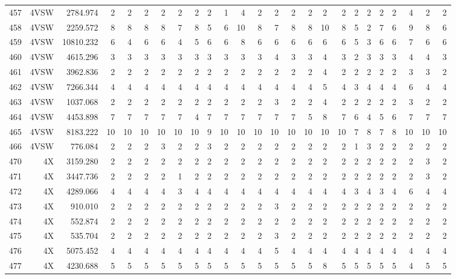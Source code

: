 \documentclass[12pt]{article}\usepackage[]{graphicx}\usepackage[]{color}
\begin{document}
\begin{landscape}
\begin{longtable}[t]{crrrrrrrrrrrrrrrcrrrrrrrr}
457 & 4VSW & 2784.974 & 2 & 2 & 2 & 2 & 2 & 2 & 2 & 1 & 4 & 2 & 2 & 2 & 2 & 2 & 2 & 2 & 2 & 2 & 2 & 4 & 2 & 2\\
458 & 4VSW & 2259.572 & 8 & 8 & 8 & 8 & 7 & 8 & 5 & 6 & 10 & 8 & 7 & 8 & 8 & 10 & 8 & 5 & 2 & 7 & 6 & 9 & 8 & 6\\
459 & 4VSW & 10810.232 & 6 & 4 & 6 & 6 & 4 & 5 & 6 & 6 & 8 & 6 & 6 & 6 & 6 & 6 & 6 & 5 & 3 & 6 & 6 & 7 & 6 & 6\\
460 & 4VSW & 4615.296 & 3 & 3 & 3 & 3 & 3 & 3 & 3 & 3 & 3 & 3 & 4 & 3 & 3 & 4 & 3 & 2 & 3 & 3 & 3 & 4 & 4 & 3\\
461 & 4VSW & 3962.836 & 2 & 2 & 2 & 2 & 2 & 2 & 2 & 2 & 2 & 2 & 2 & 2 & 2 & 4 & 2 & 2 & 2 & 2 & 2 & 3 & 3 & 2\\
462 & 4VSW & 7266.344 & 4 & 4 & 4 & 4 & 4 & 4 & 4 & 4 & 4 & 4 & 4 & 4 & 4 & 5 & 4 & 3 & 4 & 4 & 4 & 6 & 4 & 4\\
463 & 4VSW & 1037.068 & 2 & 2 & 2 & 2 & 2 & 2 & 2 & 2 & 2 & 2 & 3 & 2 & 2 & 4 & 2 & 2 & 2 & 2 & 2 & 3 & 2 & 2\\
464 & 4VSW & 4453.898 & 7 & 7 & 7 & 7 & 7 & 4 & 7 & 7 & 7 & 7 & 7 & 7 & 5 & 8 & 7 & 6 & 4 & 5 & 6 & 7 & 7 & 7\\
465 & 4VSW & 8183.222 & 10 & 10 & 10 & 10 & 10 & 10 & 9 & 10 & 10 & 10 & 10 & 10 & 10 & 10 & 10 & 7 & 8 & 7 & 8 & 10 & 10 & 10\\
466 & 4VSW & 776.084 & 2 & 2 & 2 & 3 & 2 & 2 & 3 & 2 & 2 & 2 & 2 & 2 & 2 & 2 & 2 & 1 & 3 & 2 & 2 & 2 & 2 & 2\\
470 & 4X & 3159.280 & 2 & 2 & 2 & 2 & 2 & 2 & 2 & 2 & 2 & 2 & 2 & 2 & 2 & 2 & 2 & 2 & 2 & 2 & 2 & 2 & 3 & 2\\
471 & 4X & 3447.736 & 2 & 2 & 2 & 2 & 1 & 2 & 2 & 2 & 2 & 2 & 2 & 2 & 2 & 2 & 2 & 2 & 2 & 2 & 2 & 2 & 3 & 2\\
472 & 4X & 4289.066 & 4 & 4 & 4 & 4 & 3 & 4 & 4 & 4 & 4 & 4 & 4 & 4 & 4 & 4 & 4 & 3 & 4 & 3 & 4 & 6 & 4 & 4\\
473 & 4X & 910.010 & 2 & 2 & 2 & 2 & 2 & 2 & 2 & 2 & 2 & 2 & 3 & 2 & 2 & 2 & 2 & 2 & 2 & 2 & 2 & 2 & 2 & 2\\
474 & 4X & 552.874 & 2 & 2 & 2 & 2 & 2 & 2 & 2 & 2 & 2 & 2 & 2 & 2 & 2 & 2 & 2 & 2 & 2 & 2 & 2 & 2 & 2 & 2\\
475 & 4X & 535.704 & 2 & 2 & 2 & 2 & 2 & 2 & 2 & 2 & 2 & 2 & 3 & 2 & 2 & 2 & 2 & 2 & 2 & 2 & 2 & 2 & 2 & 2\\
476 & 4X & 5075.452 & 4 & 4 & 4 & 4 & 4 & 4 & 4 & 4 & 4 & 4 & 5 & 4 & 4 & 4 & 4 & 4 & 4 & 4 & 4 & 4 & 4 & 4\\
477 & 4X & 4230.688 & 5 & 5 & 5 & 5 & 5 & 5 & 5 & 5 & 5 & 5 & 5 & 5 & 5 & 8 & 5 & 5 & 5 & 5 & 5 & 4 & 5 & 5\\

\end{longtable}
\end{landscape}
\end{document}
